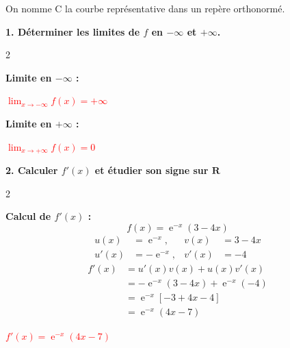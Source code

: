 \documentclass[11pt,a4paper]{article}
\DeclareMathOperator{\e}{e}
\begin{document}
On nomme C la courbe représentative dans un repère orthonormé.

\textbf{1. Déterminer les limites de $f$ en $-\infty$ et  $+\infty$.}

\begin{tcolorbox}[colback=red!5!white,colframe=red!75!black]
\begin{multicols}{2}
    

{
\begin{center}
    

\textbf{Limite en $-\infty$ :}

 \textbf{\textcolor{red}{$\displaystyle \lim_{x \to -\infty} f(x) = +\infty$}}
\columnbreak

\textbf{Limite en $+\infty$ :}

 \textbf{\textcolor{red}{$\displaystyle \lim_{x \to +\infty} f(x) = 0$}}
\end{center}}
\end{multicols}
\end{tcolorbox}

\vspace{3mm}

\textbf{2. Calculer $f'(x)$ et étudier son signe sur $\mathbf{R}$}

\begin{tcolorbox}[colback=red!5!white,colframe=red!75!black]
{

\begin{multicols}{2}
    

\textbf{Calcul de $f'(x)$ :}
\[
f(x) = \e^{-x}(3-4x)
\]
\[
\begin{aligned}
u(x) &= \e^{-x}, & v(x) &= 3-4x \\
u'(x) &= -\e^{-x}, & v'(x) &= -4
\end{aligned}
\]
\[
\begin{aligned}
    f'(x) & = u'(x)v(x) + u(x)v'(x)  \\
            & = -\e^{-x}(3-4x) + \e^{-x}(-4) \\
            & = \e^{-x}[-3+4x-4] \\
            & = \e^{-x}(4x-7)
\end{aligned}
\]
\begin{center}
\textbf{\textcolor{red}{$f'(x) = \e^{-x}(4x-7)$}}
\end{center}

\end{multicols}

}
\end{tcolorbox}
\end{document}
